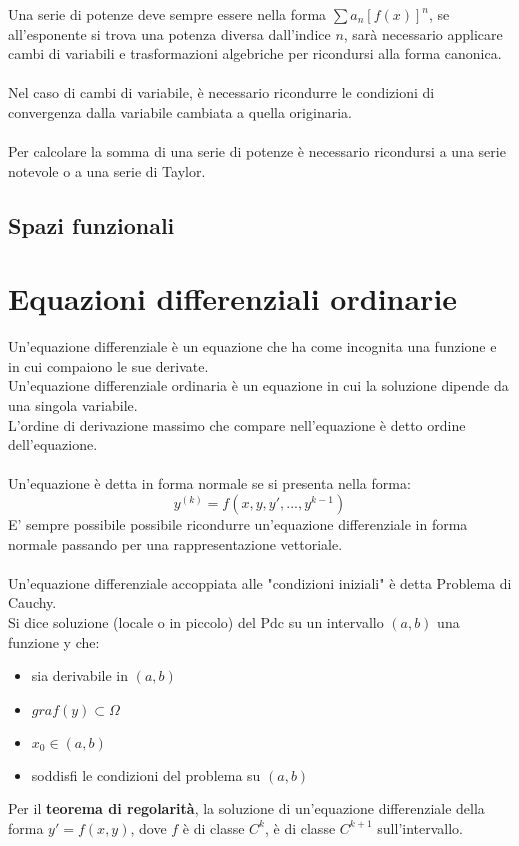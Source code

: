 \documentclass{article}
\begin{document}
Una serie di potenze deve sempre essere nella forma $\sum a_n[f(x)]^n$, se all'esponente si trova una potenza diversa dall'indice $n$, sarà necessario applicare cambi di variabili e trasformazioni algebriche per ricondursi alla forma canonica.\\\\
Nel caso di cambi di variabile, è necessario ricondurre le condizioni di convergenza dalla variabile cambiata a quella originaria.\\\\
Per calcolare la somma di una serie di potenze è necessario ricondursi a una serie notevole o a una serie di Taylor.

\subsection{Spazi funzionali}


\newpage
\section{Equazioni differenziali ordinarie}
Un'equazione differenziale è un equazione che ha come incognita una funzione e in cui compaiono le sue derivate.\\
Un'equazione differenziale ordinaria è un equazione in cui la soluzione dipende da una singola variabile.\\
L'ordine di derivazione massimo che compare nell'equazione è detto ordine dell'equazione.\\\\
Un'equazione è detta in forma normale se si presenta nella forma:
$$ y^{(k)}=f(x,y,y',...,y^{k-1}) $$
E' sempre possibile possibile ricondurre un'equazione differenziale in forma normale passando per una rappresentazione vettoriale.\\\\
Un'equazione differenziale accoppiata alle "condizioni iniziali" è detta Problema di Cauchy.\\
Si dice soluzione (locale o in piccolo) del Pdc su un intervallo $(a,b)$ una funzione y che:
\begin{itemize}
    \item sia derivabile in $(a,b)$
    \item $graf(y)\subset\Omega$
    \item $x_0\in(a,b)$
    \item soddisfi le condizioni del problema su $(a,b)$
\end{itemize}
Per il \textbf{teorema di regolarità}, la soluzione di un'equazione differenziale della forma $y'=f(x,y)$, dove $f$ è di classe $C^k$, è di classe $C^{k+1}$ sull'intervallo.
\end{document}
